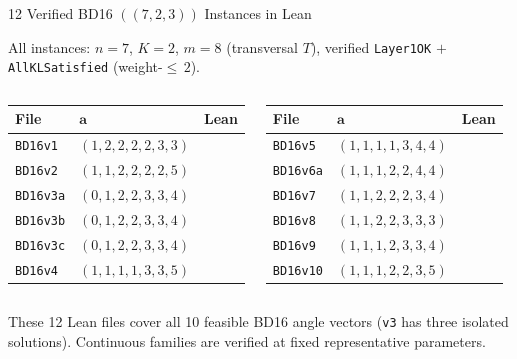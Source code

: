 \documentclass[aspectratio=169,t]{beamer}
\newcommand{\code}[1]{\texttt{\small #1}}
\newcommand{\chk}{\textcolor{Sage}{\checkmark}}
\begin{document}
\begin{frame}{12 Verified BD16 $((7,2,3))$ Instances in Lean}

All instances: $n{=}7$, $K{=}2$, $m{=}8$ (transversal $T$),
verified \code{Layer1OK} $+$ \code{AllKLSatisfied} (weight-${\leq}\,2$).

\vspace{0.2em}
\begin{columns}[T]
\begin{center}
{\scriptsize
\begin{tabular}{@{}lll@{}}
\toprule
\textbf{File} & \textbf{$\mathbf{a}$} & \textbf{Lean} \\
\midrule
\code{BD16v1}  & $(1,2,2,2,2,3,3)$ & \chk \\
\code{BD16v2}  & $(1,1,2,2,2,2,5)$ & \chk \\
\code{BD16v3a} & $(0,1,2,2,3,3,4)$ & \chk \\
\code{BD16v3b} & $(0,1,2,2,3,3,4)$ & \chk \\
\code{BD16v3c} & $(0,1,2,2,3,3,4)$ & \chk \\
\code{BD16v4}  & $(1,1,1,1,3,3,5)$ & \chk \\
\bottomrule
\end{tabular}
}
\end{center}

\begin{center}
{\scriptsize
\begin{tabular}{@{}lll@{}}
\toprule
\textbf{File} & \textbf{$\mathbf{a}$} & \textbf{Lean} \\
\midrule
\code{BD16v5}   & $(1,1,1,1,3,4,4)$ & \chk \\
\code{BD16v6a}  & $(1,1,1,2,2,4,4)$ & \chk \\
\code{BD16v7}   & $(1,1,2,2,2,3,4)$ & \chk \\
\code{BD16v8}   & $(1,1,2,2,3,3,3)$ & \chk \\
\code{BD16v9}   & $(1,1,1,2,3,3,4)$ & \chk \\
\code{BD16v10}  & $(1,1,1,2,2,3,5)$ & \chk \\
\bottomrule
\end{tabular}
}
\end{center}
\end{columns}

\vspace{-0.3em}
\textcolor{Slate}{\small
These 12 Lean files cover all 10 feasible BD16 angle vectors
(\code{v3} has three isolated solutions). Continuous families are verified at fixed representative parameters.
}
\end{frame}
\end{document}
